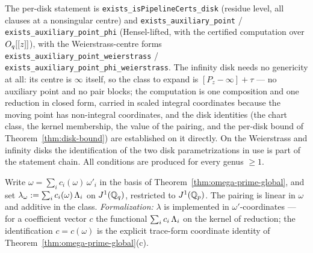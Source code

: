\begin{remark}[Formalization]
The per-disk statement is
\texttt{exists\_isPipelineCerts\_disk} (residue level, all clauses at a nonsingular
centre) and \texttt{exists\_auxiliary\_point} /
\texttt{exists\_auxiliary\_point\_phi} (Hensel-lifted, with the certified computation
over $O_q[[z]]$), with the Weierstrass-centre forms
\texttt{exists\_auxiliary\_point\_weierstrass} /
\texttt{exists\_auxiliary\_point\_phi\_weierstrass}. The infinity disk needs no
genericity at all: its centre is $\infty$ itself, so the class to expand is
$[P_z - \infty] + \tau$ --- no auxiliary point and no pair blocks; the computation is
one composition and one reduction in closed form, carried in scaled integral
coordinates because the moving point has non-integral coordinates, and the disk
identities (the chart class, the kernel membership, the value of the pairing, and the
per-disk bound of Theorem~\ref{thm:disk-bound}) are established on it directly. On the
Weierstrass and infinity disks the identification of the two disk parametrizations in
use is part of the statement chain. All conditions are produced for every genus
$\ge 1$.
\end{remark}

\begin{definition}
\label{def:lambda1}
\leanok
{}
Write $\omega = \sum_i c_i(\omega)\,\omega'_i$ in the basis of
Theorem~\ref{thm:omega-prime-global}, and set
$\lambda_\omega := \sum_i c_i(\omega)\,\Lambda_i$ on $J^1(\mathbb{Q}_q)$, restricted to $J^1(\mathbb{Q}_p)$.
The pairing is linear in $\omega$ and additive in the class. \emph{Formalization:}
$\lambda$ is implemented in $\omega'$-coordinates --- for a coefficient vector $c$ the
functional $\sum_i c_i\,\Lambda_i$ on the kernel of reduction; the identification
$c = c(\omega)$ is the explicit trace-form coordinate identity of
Theorem~\ref{thm:omega-prime-global}(c).
\end{definition}


